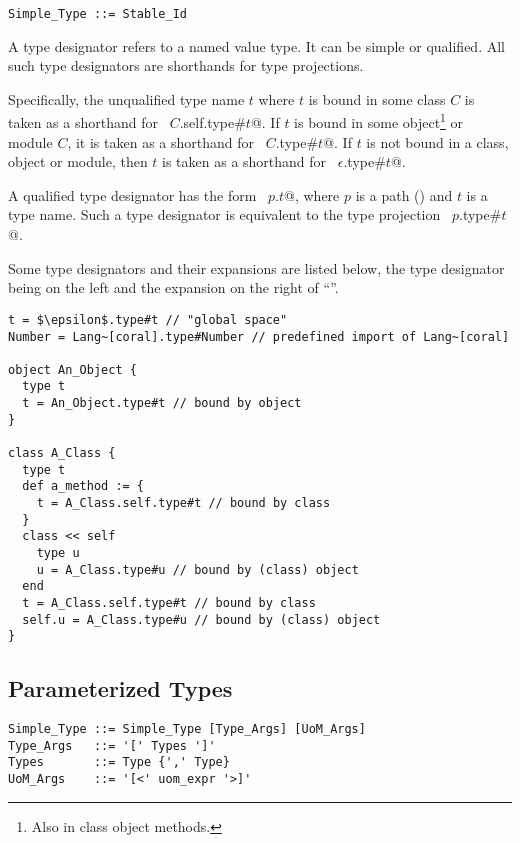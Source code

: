 \syntax\begin{lstlisting}
Simple_Type ::= Stable_Id
\end{lstlisting}

A type designator refers to a named value type. It can be simple or qualified. All such type designators are shorthands for type projections. 

Specifically, the unqualified type name $t$ where $t$ is bound in some class $C$ is taken as a shorthand for ~\lstinline@$C$.self.type#$t$@. If $t$ is bound in some object\footnote{Also in class object methods.} or module $C$, it is taken as a shorthand for ~\lstinline@$C$.type#$t$@. If $t$ is not bound in a class, object or module, then $t$ is taken as a shorthand for ~\lstinline@$\epsilon$.type#$t$@. 

A qualified type designator has the form ~\lstinline@$p$.$t$@, where $p$ is a path () and $t$ is a type name. Such a type designator is equivalent to the type projection ~\lstinline@$p$.type#$t$@. 

\example Some type designators and their expansions are listed below, the type designator being on the left and the expansion on the right of ``\code{=}''. 
\begin{lstlisting}
t = $\epsilon$.type#t // "global space"
Number = Lang~[coral].type#Number // predefined import of Lang~[coral]

object An_Object {
  type t
  t = An_Object.type#t // bound by object
}

class A_Class {
  type t
  def a_method := {
    t = A_Class.self.type#t // bound by class
  }
  class << self
    type u
    u = A_Class.type#u // bound by (class) object
  end
  t = A_Class.self.type#t // bound by class
  self.u = A_Class.type#u // bound by (class) object
}
\end{lstlisting}






\subsection{Parameterized Types}
\label{sec:parameterized-types}

\syntax\begin{lstlisting}
Simple_Type ::= Simple_Type [Type_Args] [UoM_Args]
Type_Args   ::= '[' Types ']'
Types       ::= Type {',' Type}
UoM_Args    ::= '[<' uom_expr '>]'
\end{lstlisting}

